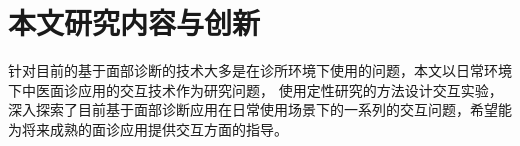 















\section{本文研究内容与创新}

针对目前的基于面部诊断的技术大多是在诊所环境下使用的问题，本文以日常环境下中医面诊应用的交互技术作为研究问题，
使用定性研究的方法设计交互实验，深入探索了目前基于面部诊断应用在日常使用场景下的一系列的交互问题，希望能为将来成熟的面诊应用提供交互方面的指导。

